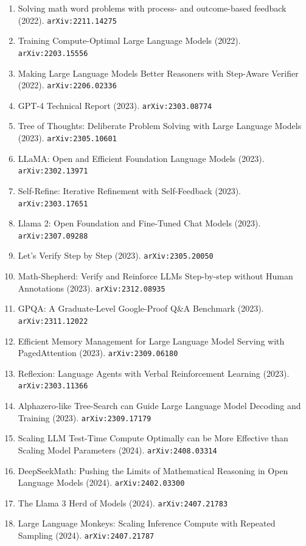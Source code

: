 \documentclass[11pt]{article}
\begin{document}
\begin{enumerate}
  Models (2022). \texttt{arXiv:2205.10625}
  \item Solving math word problems with process- and outcome-based feedback (2022). \texttt{arXiv:2211.14275}
  \item Training Compute-Optimal Large Language Models (2022). \texttt{arXiv:2203.15556}
  \item Making Large Language Models Better Reasoners with Step-Aware Verifier (2022). \texttt{arXiv:2206.02336}
  \item GPT-4 Technical Report (2023). \texttt{arXiv:2303.08774}
  \item Tree of Thoughts: Deliberate Problem Solving with Large Language Models (2023). \texttt{arXiv:2305.10601}
  \item LLaMA: Open and Efficient Foundation Language Models (2023). \texttt{arXiv:2302.13971}
  \item Self-Refine: Iterative Refinement with Self-Feedback (2023). \texttt{arXiv:2303.17651}
  \item Llama 2: Open Foundation and Fine-Tuned Chat Models (2023). \texttt{arXiv:2307.09288}
  \item Let's Verify Step by Step (2023). \texttt{arXiv:2305.20050}
  \item Math-Shepherd: Verify and Reinforce LLMs Step-by-step without Human
  Annotations (2023). \texttt{arXiv:2312.08935}
  \item GPQA: A Graduate-Level Google-Proof Q\&A Benchmark (2023). \texttt{arXiv:2311.12022}
  \item Efficient Memory Management for Large Language Model Serving with
  PagedAttention (2023). \texttt{arXiv:2309.06180}
  \item Reflexion: Language Agents with Verbal Reinforcement Learning (2023). \texttt{arXiv:2303.11366}
  \item Alphazero-like Tree-Search can Guide Large Language Model Decoding and
  Training (2023). \texttt{arXiv:2309.17179}
  \item Scaling LLM Test-Time Compute Optimally can be More Effective than
  Scaling Model Parameters (2024). \texttt{arXiv:2408.03314}
  \item DeepSeekMath: Pushing the Limits of Mathematical Reasoning in Open
  Language Models (2024). \texttt{arXiv:2402.03300}
  \item The Llama 3 Herd of Models (2024). \texttt{arXiv:2407.21783}
  \item Large Language Monkeys: Scaling Inference Compute with Repeated Sampling (2024). \texttt{arXiv:2407.21787}

\end{enumerate}
\end{document}
